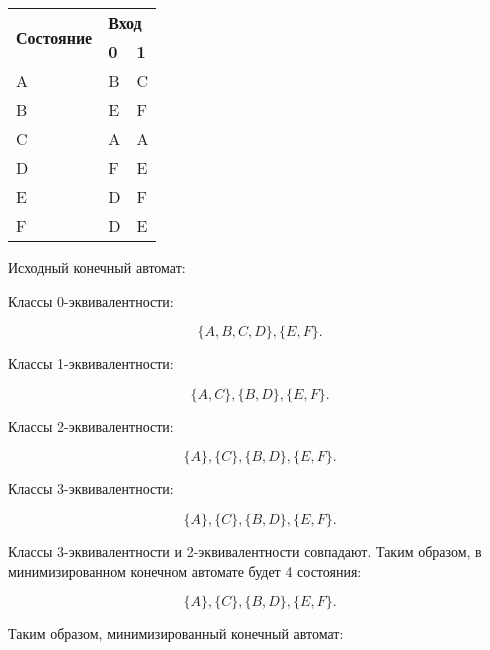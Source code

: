 \begin{table}[h!]
\caption{}
\label{tab:my-table}
\begin{tabular}{|l|ll|}
\hline
\multirow{2}{*}{\textbf{Состояние}} & \multicolumn{2}{l|}{\textbf{Вход}}           \\ \cline{2-3} 
                                    & \multicolumn{1}{l|}{\textbf{0}} & \textbf{1} \\ \hline
A                                   & \multicolumn{1}{l|}{B}          & C          \\ \hline
B                                   & \multicolumn{1}{l|}{E}          & F          \\ \hline
C                                   & \multicolumn{1}{l|}{A}          & A          \\ \hline
D                                   & \multicolumn{1}{l|}{F}          & E          \\ \hline
E                                   & \multicolumn{1}{l|}{D}          & F          \\ \hline
F                                   & \multicolumn{1}{l|}{D}          & E          \\ \hline
\end{tabular}
\end{table}

Исходный конечный автомат:

Классы 0-эквивалентности:

\begin{equation*}
\{A, B, C, D\}, \{E, F\}.
\end{equation*}

Классы 1-эквивалентности:

\begin{equation*}
\{A, C\}, \{B, D\}, \{E, F\}.
\end{equation*}

Классы 2-эквивалентности:

\begin{equation*}
\{A\}, \{C\}, \{B, D\}, \{E, F\}.
\end{equation*}

Классы 3-эквивалентности:

\begin{equation*}
\{A\}, \{C\}, \{B, D\}, \{E, F\}.
\end{equation*}

Классы 3-эквивалентности и 2-эквивалентности совпадают. Таким образом, в минимизированном конечном автомате будет 4 состояния:

\begin{equation*}
\{A\}, \{C\}, \{B, D\}, \{E, F\}.
\end{equation*}

Таким образом, минимизированный конечный автомат:


\newpage